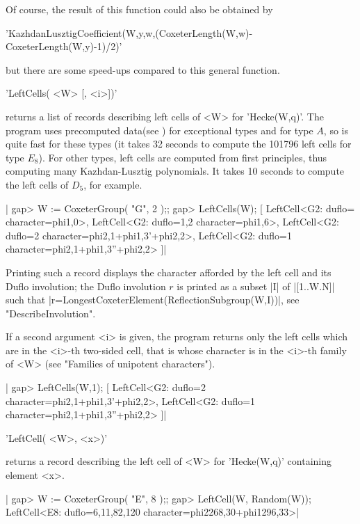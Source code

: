Of course, the result of this function could also be obtained by

'KazhdanLusztigCoefficient(W,y,w,(CoxeterLength(W,w)-CoxeterLength(W,y)-1)/2)'

but there are some speed-ups compared to this general function.


'LeftCells( <W> [, <i>])'

returns  a list of  records describing left  cells of <W> for 'Hecke(W,q)'.
The  program uses  precomputed data(see  \cite{GH14}) for exceptional types
and  for type $A$, so is quite fast for these types (it takes 32 seconds to
compute  the 101796 left cells for type $E_8$). For other types, left cells
are  computed from  first principles,  thus computing  many Kazhdan-Lusztig
polynomials.  It takes 10 seconds  to compute the left  cells of $D_5$, for
example.

|    gap> W := CoxeterGroup( "G", 2 );;
    gap> LeftCells(W);
    [ LeftCell<G2: duflo= character=phi{1,0}>, 
      LeftCell<G2: duflo=1,2 character=phi{1,6}>,
      LeftCell<G2: duflo=2 character=phi{2,1}+phi{1,3}'+phi{2,2}>, 
      LeftCell<G2: duflo=1 character=phi{2,1}+phi{1,3}''+phi{2,2}> ]|

Printing such a record displays the character afforded by the left cell and
its  Duflo involution; the Duflo involution $r$  is printed as a subset |I|
of |[1..W.N]| such that |r=LongestCoxeterElement(ReflectionSubgroup(W,I))|,
see "DescribeInvolution".

If  a second argument <i> is given, the program returns only the left cells
which  are in the <i>-th two-sided cell,  that is whose character is in the
<i>-th family of <W> (see "Families of unipotent characters").

|    gap> LeftCells(W,1);
    [ LeftCell<G2: duflo=2 character=phi{2,1}+phi{1,3}'+phi{2,2}>, 
      LeftCell<G2: duflo=1 character=phi{2,1}+phi{1,3}''+phi{2,2}> ]|


'LeftCell( <W>, <x>)'

returns  a  record  describing  the  left  cell  of  <W>  for  'Hecke(W,q)'
containing element <x>.

|    gap> W := CoxeterGroup( "E", 8 );;
    gap> LeftCell(W, Random(W));
    LeftCell<E8: duflo=6,11,82,120 character=phi{2268,30}+phi{1296,33}>|


